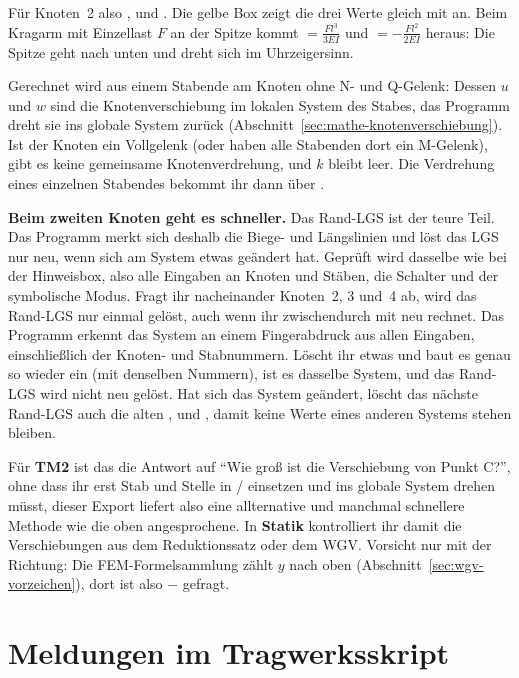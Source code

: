 Für Knoten~2 also ,  und . Die gelbe Box zeigt die drei
Werte gleich mit an. Beim Kragarm mit Einzellast $F$ an der Spitze kommt
 $= \frac{F l^3}{3EI}$ und  $= -\frac{F l^2}{2EI}$ heraus: Die Spitze
geht nach unten und dreht sich im Uhrzeigersinn.

Gerechnet wird aus einem Stabende am Knoten ohne N- und Q-Gelenk: Dessen $u$ und $w$ sind die
Knotenverschiebung im lokalen System des Stabes, das Programm dreht sie ins globale System zurück
(Abschnitt~\ref{sec:mathe-knotenverschiebung}). Ist der Knoten ein Vollgelenk (oder haben alle
Stabenden dort ein M-Gelenk), gibt es keine gemeinsame Knotenverdrehung, und $k$
bleibt leer. Die Verdrehung eines einzelnen Stabendes bekommt ihr dann über
.

\textbf{Beim zweiten Knoten geht es schneller.} Das Rand-LGS ist der teure Teil. Das Programm merkt
sich deshalb die Biege- und Längslinien und löst das LGS nur neu, wenn sich am System etwas
geändert hat. Geprüft wird dasselbe wie bei der Hinweisbox, also alle Eingaben an Knoten und
Stäben, die Schalter und der symbolische Modus. Fragt ihr nacheinander Knoten~2, 3 und~4 ab, wird
das Rand-LGS nur einmal gelöst, auch wenn ihr zwischendurch mit  neu rechnet. Das Programm
erkennt das System an einem Fingerabdruck aus allen Eingaben, einschließlich der Knoten- und
Stabnummern. Löscht ihr etwas und baut es genau so wieder ein (mit denselben Nummern), ist es
dasselbe System, und das Rand-LGS wird nicht neu gelöst.
Hat sich das System geändert, löscht das nächste Rand-LGS auch die alten ,
 und , damit keine Werte eines anderen Systems stehen bleiben.

Für \textbf{TM2} ist das die Antwort auf \enquote{Wie groß ist die Verschiebung von Punkt C?},
ohne dass ihr erst Stab und Stelle in / einsetzen und ins globale System drehen
müsst, dieser Export liefert also eine allternative und manchmal schnellere Methode wie die oben angesprochene.
In \textbf{Statik} kontrolliert ihr damit die Verschiebungen aus dem Reduktionssatz oder dem
WGV. Vorsicht nur mit der Richtung: Die FEM-Formelsammlung zählt $y$ nach oben
(Abschnitt~\ref{sec:wgv-vorzeichen}), dort ist also $-$ gefragt.

\section{Meldungen im Tragwerksskript}

